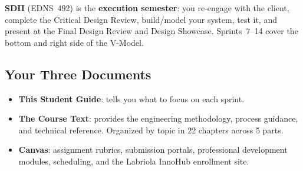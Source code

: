 \textbf{SDII} (EDNS~492) is the \textbf{execution semester}: you re-engage with the client, complete the Critical Design Review, build/model your system, test it, and present at the Final Design Review and Design Showcase. Sprints~7--14 cover the bottom and right side of the V-Model.

\subsection{Your Three Documents}
\begin{itemize}[nosep,leftmargin=1.5em]
\item \textbf{This Student Guide}: tells you what to focus on each sprint.
\item \textbf{The Course Text}: provides the engineering methodology, process guidance, and technical reference. Organized by topic in 22 chapters across 5 parts.
\item \textbf{Canvas}: assignment rubrics, submission portals, professional development modules, scheduling, and the Labriola InnoHub enrollment site.
\end{itemize}


